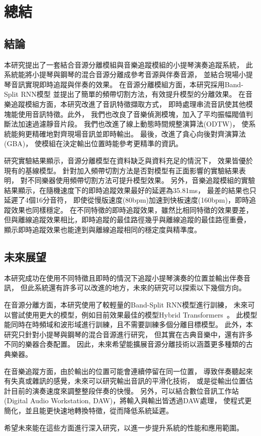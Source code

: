 \documentclass[class=NCU_thesis, crop=false]{standalone}
\begin{document}
\chapter{總結}

\section{結論}
本研究提出了一套結合音源分離模組與音樂追蹤模組的小提琴演奏追蹤系統，
此系統能將小提琴與鋼琴的混合音源分離成參考音源與伴奏音源，
並結合現場小提琴音訊實現即時追蹤與伴奏的效果。
在音源分離模組方面，本研究採用Band-Split RNN模型
並提出了簡單的頻帶切割方法，有效提升模型的分離效果。
在音樂追蹤模組方面，本研究改進了音訊特徵擷取方式，
即時處理串流音訊使其他模塊能使用音訊特徵。此外，
我們也改良了音樂偵測模塊，加入了平均振幅閥值判斷法加速過濾靜音片段。
我們也改進了線上動態時間規整演算法(ODTW)，
使系統能夠更精確地對齊現場音訊並即時輸出。
最後，改進了貪心向後對齊演算法(GBA)，
使模組在決定輸出位置時能參考更精準的資訊。

研究實驗結果顯示，音源分離模型在資料缺乏與資料充足的情況下，
效果皆優於現有的基線模型。
針對加入頻帶切割方法是否對模型有正面影響的實驗結果表明，
對不同樂器使用頻帶切割方法可提升模型效果。
另外，音樂追蹤模組的實驗結果顯示，在隨機速度下的即時追蹤效果最好的延遲為35.81ms，
最差的結果也只延遲了4個16分音符，
即使從慢版速度(80bpm)加速到快板速度(160bpm)，即時追蹤效果也同樣穩定。
在不同特徵的即時追蹤效果，雖然比相同特徵的效果要差，
但與離線追蹤效果相比，即時追蹤的最佳路徑幾乎與離線追蹤的最佳路徑重疊，
顯示即時追蹤效果也能達到與離線追蹤相同的穩定度與精準度。

\pagebreak

\section{未來展望}
本研究成功在使用不同特徵且即時的情況下追蹤小提琴演奏的位置並輸出伴奏音訊，
但此系統還有許多可以改進的地方，未來的研究可以探索以下幾個方向。

在音源分離方面，本研究使用了較輕量的Band-Split RNN模型進行訓練，
未來可以嘗試使用更大的模型，例如目前效果最佳的模型Hybrid Transformers~\cite{rouard2023hybrid}。
此模型能同時在時頻域和波形域進行訓練，且不需要訓練多個分離目標模型。
此外，本研究只針對小提琴與鋼琴的混合音源進行研究，
但其實在古典音樂中，還有許多不同的樂器合奏配置。
因此，未來希望能擴展音源分離技術以涵蓋更多種類的古典樂器。

在音樂追蹤方面，由於輸出的位置可能會連續停留在同一位置，
導致伴奏聽起來有失真或雜訊的感覺，未來可以研究輸出音訊的平滑化技術，
或是從輸出位置估計目前的演奏速度來調整整段伴奏的快慢。
另外，可以結合數位音訊工作站(Digital Audio Workstation, DAW)，將輸入與輸出皆透過DAW處理，
使程式更簡化，並且能更快速地轉換特徵，從而降低系統延遲。

希望未來能在這些方面進行深入研究，以進一步提升系統的性能和應用範圍。


\end{document}
